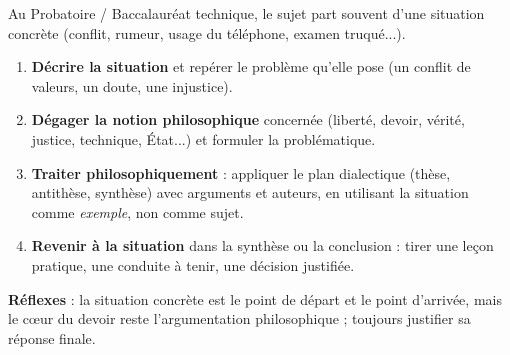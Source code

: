 \documentclass[11pt]{article}
\newcommand{\cle}[1]{{\popxbold\color{popdark}#1}}
\begin{document}
\begin{methode}
Au Probatoire / Baccalauréat technique, le sujet part souvent d'une situation concrète (conflit, rumeur, usage du téléphone, examen truqué...).
\begin{enumerate}
\item \textbf{Décrire la situation} et repérer le \cle{problème} qu'elle pose (un conflit de valeurs, un doute, une injustice).
\item \textbf{Dégager la notion philosophique} concernée (liberté, devoir, vérité, justice, technique, État...) et formuler la problématique.
\item \textbf{Traiter philosophiquement} : appliquer le plan dialectique (thèse, antithèse, synthèse) avec arguments et auteurs, en utilisant la situation comme \emph{exemple}, non comme sujet.
\item \textbf{Revenir à la situation} dans la synthèse ou la conclusion : tirer une leçon pratique, une conduite à tenir, une décision justifiée.
\end{enumerate}
\textbf{Réflexes} : la situation concrète est le point de départ et le point d'arrivée, mais le cœur du devoir reste l'argumentation philosophique ; toujours justifier sa réponse finale.
\end{methode}
\end{document}

